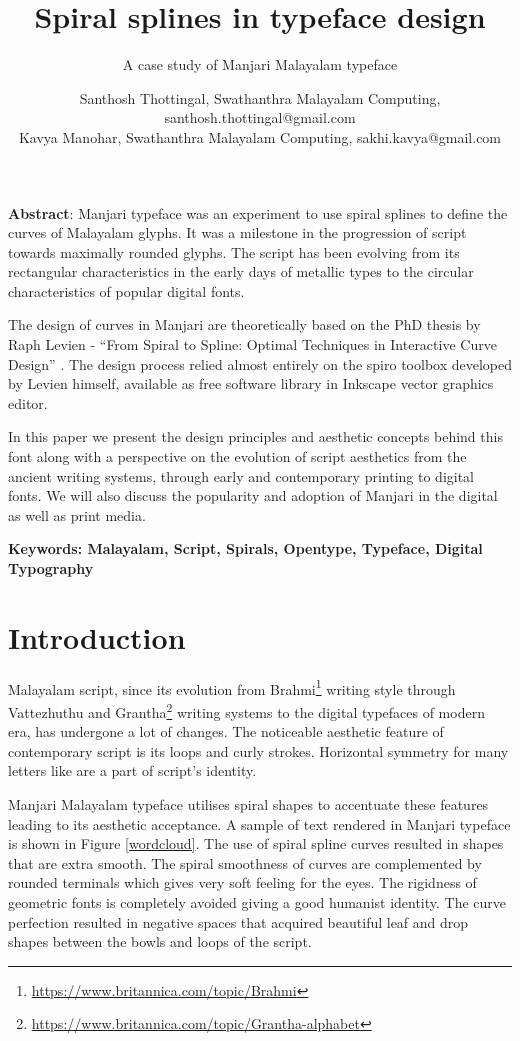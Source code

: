 \documentclass[11pt,twoside,a4paper,parskip=full]{scrartcl}
\title{Spiral splines in typeface design}
\subtitle{A case study of Manjari Malayalam typeface}
\author{%
Santhosh Thottingal, Swathanthra Malayalam Computing, santhosh.thottingal@gmail.com\\
Kavya Manohar, Swathanthra Malayalam Computing, sakhi.kavya@gmail.com
}
\begin{document}
\maketitle

\textbf{Abstract}: Manjari typeface was an experiment to use spiral splines to define the curves of Malayalam glyphs. It was a milestone in the progression of script towards maximally rounded glyphs. The script has been evolving from its rectangular characteristics in the early days of metallic types to the circular characteristics of popular digital fonts. 

The design of curves in Manjari are theoretically based on the PhD thesis by Raph Levien - ``From Spiral to Spline: Optimal Techniques in Interactive Curve Design” \cite{levien}. The design process relied almost entirely on the spiro toolbox developed by Levien himself, available as free software library in Inkscape vector graphics editor.

In this paper we present the design principles and aesthetic concepts behind this font along with a perspective on the evolution of script aesthetics from the ancient writing systems, through early and contemporary printing to digital fonts. We will also discuss the popularity and adoption of Manjari in the digital as well as print media.

\textbf{Keywords: Malayalam, Script, Spirals, Opentype, Typeface, Digital Typography}

\section{Introduction}

Malayalam script, since its evolution from Brahmi\footnote{\url{https://www.britannica.com/topic/Brahmi}} writing style through Vattezhuthu and Grantha\footnote{\url{https://www.britannica.com/topic/Grantha-alphabet}} writing systems to the digital typefaces of modern era, has undergone a lot of changes. The noticeable aesthetic feature of contemporary script is its loops and curly strokes. Horizontal symmetry for many letters like {} are a part of script's identity. 

Manjari Malayalam typeface utilises spiral shapes to accentuate these features leading to its aesthetic acceptance. A sample of text rendered in Manjari typeface is shown in Figure \ref{wordcloud}. The use of spiral spline curves resulted in shapes that are extra smooth. The spiral smoothness of curves are complemented by rounded terminals which gives very soft feeling for the eyes. The rigidness of geometric fonts is completely avoided giving a good humanist identity. The curve perfection resulted in negative spaces that acquired beautiful leaf and drop shapes between the bowls and loops of the script. 
\end{document}
